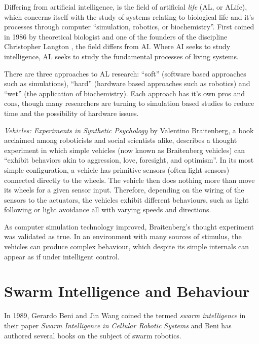 Differing from artificial intelligence, is the field of artificial \textit{life} (AL, or ALife), which concerns itself with the study of systems relating to biological life and it's processes through computer ``simulation, robotics, or biochemistry''. \cite{artlife} First coined in 1986 by theoretical biologist and one of the founders of the discipline Christopher Langton \cite{langton}, the field differs from AI. Where AI seeks to study intelligence, AL seeks to study the fundamental processes of living systems. 

There are three approaches to AL research: ``soft'' (software based approaches such as simulations), ``hard'' (hardware based approaches such as robotics) and ``wet'' (the application of biochemistry). Each approach has it's own pros and cons, though many researchers are turning to simulation based studies to reduce time and the possibility of hardware issues.

\textit{Vehicles: Experiments in Synthetic Psychology} by Valentino Braitenberg, a book acclaimed among roboticists and social scientists alike, describes a thought experiment in which simple vehicles (now known as Braitenberg vehicles) can ``exhibit behaviors akin to aggression, love, foresight, and optimism''. \cite{braitenberg1986vehicles} In its most simple configuration, a vehicle has primitive sensors (often light sensors) connected directly to the wheels. The vehicle then does nothing more than move its wheels for a given sensor input. Therefore, depending on the wiring of the sensors to the actuators, the vehicles exhibit different behaviours, such as light following or light avoidance all with varying speeds and directions. 

As computer simulation technology improved, Braitenberg's thought experiment was validated as true. In an environment with many sources of stimulus, the vehicles can produce complex behaviour, which despite its simple internals can appear as if under intelligent control.

\section{Swarm Intelligence and Behaviour}

In 1989, Gerardo Beni and Jin Wang coined the termed \textit{swarm intelligence} in their paper \textit{Swarm Intelligence in Cellular Robotic Systems} and Beni has authored several books on the subject of swarm robotics.

